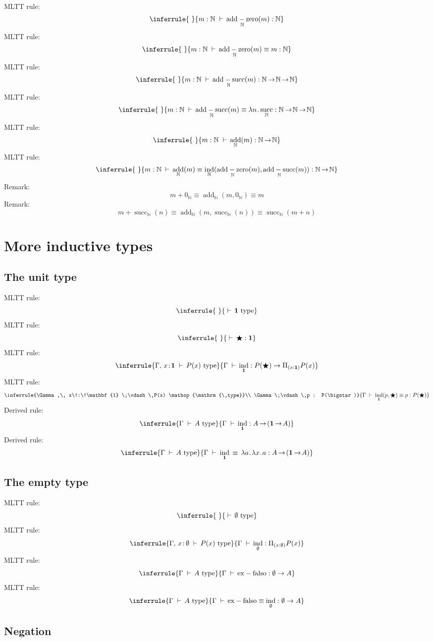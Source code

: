 \documentclass[12pt]{article}
\renewcommand{\.}{\hskip 0.7pt}
\renewcommand{\d}{\;\vdash\,}
\renewcommand{\r}{\!\.\rightarrow\!}
\DeclareMathOperator{\type}{\,type}
\newcommand{\N}{\mathbb{N}}
\DeclareMathOperator{\s}{succ}
\DeclareMathOperator{\ind}{ind}
\DeclareMathOperator{\add}{add}
\DeclareMathOperator{\addz}{add-zero}
\DeclareMathOperator{\adds}{add-succ}
\DeclareMathOperator{\exfalso}{ex-falso}
\begin{document}
MLTT rule:
$$\inferrule
{~}
{m : \N \d \addz_\N(m) : \N}
$$
MLTT rule:
$$\inferrule
{~}
{m : \N \d \addz_\N(m) \equiv m : \N}
$$
MLTT rule:
$$\inferrule
{~}
{m : \N \d \adds_\N(m) : \N \r \N \r \N}
$$
MLTT rule:
$$\inferrule
{~}
{m : \N \d \adds_\N(m) \equiv \lambda n \.. \s_\N : \N \r \N \r \N}
$$
MLTT rule:
$$\inferrule
{~}
{m : \N \d \add_\N(m) : \N \r \N}
$$
MLTT rule:
$$\inferrule
{~}
{m : \N \d \add_\N(m) \equiv \ind_\N(\addz_\N(m), \adds_\N(m)) : \N \r \N}
\medskip
$$
Remark:
$$m + 0_\N \equiv \add_\N(m, 0_\N) \equiv m$$
Remark:
$$m + \s_\N(n) \equiv \add_\N(m, \s_\N(n)) \equiv \s_\N(m+n)$$

\newpage
\section{More inductive types}

\subsection{The unit type}

MLTT rule:
$$\inferrule
{~}
{\d \mathbf{1} \type}
$$
MLTT rule:
$$\inferrule
{~}
{\d \bigstar : \mathbf{1}}
$$
MLTT rule:
$$\inferrule
{\Gamma,\, x\!:\!\mathbf{1} \d P(x) \type}
{\Gamma \d \ind_\mathbf{1} : P(\bigstar) \rightarrow \Pi_{(x:\mathbf{1})}P(x)}
$$
MLTT rule:
$$\inferrule
{\Gamma,\, x\!:\!\mathbf{1} \d P(x) \type \\ \Gamma \d p : P(\bigstar)}
{\Gamma \d \ind_\mathbf{1}(p,\bigstar) \equiv p : P(\bigstar)}
$$
Derived rule:
$$\inferrule
{\Gamma \d A \type}
{\Gamma \d \ind_\mathbf{1} : A \r (\mathbf{1} \r A)}
$$
Derived rule:
$$\inferrule
{\Gamma \d A \type}
{\Gamma \d\. \ind_\mathbf{1} \,\equiv\, \lambda a \..\. \lambda x \..\. a : A \r (\mathbf{1} \r A)}
$$

\subsection{The empty type}

MLTT rule:
$$\inferrule
{~}
{\d \emptyset \type}
$$
MLTT rule:
$$\inferrule
{\Gamma,\, x\!:\!\.\emptyset \d P(x) \type}
{\Gamma \d \ind_\emptyset : \Pi_{(x:\emptyset)}P(x)}
$$
MLTT rule:
$$\inferrule
{\Gamma \d A \type}
{\Gamma \d \exfalso : \emptyset \rightarrow A}
$$
MLTT rule:
$$\inferrule
{\Gamma \d A \type}
{\Gamma \d \exfalso \equiv \ind_\emptyset : \emptyset \rightarrow A}
$$

\subsection{Negation}
\end{document}
